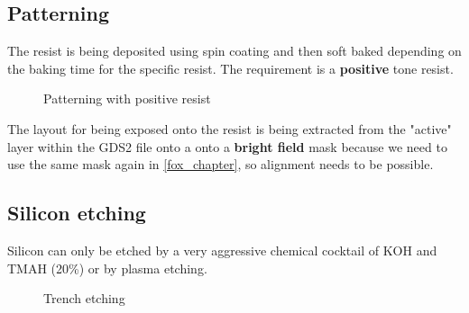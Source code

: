 \newpage

\subsection{Patterning}

The resist is being deposited using spin coating and then soft baked depending on the baking time for the specific resist.
The requirement is a \textbf{positive} tone resist.

\begin{figure}[H]
	\centering
	\begin{tikzpicture}[node distance = 3cm, auto, thick,scale=\CrossSectionOnly, every node/.style={transform shape}]
		
	\end{tikzpicture}
	\begin{tikzpicture}[node distance = 3cm, auto, thick,scale=\CrossSectionOnly, every node/.style={transform shape}]
		
	\end{tikzpicture}
	\caption{Patterning with positive resist}
\end{figure}

The layout for being exposed onto the resist is being extracted from the "active" layer within the GDS2 file onto a  onto a \textbf{bright field} mask because we need to use the same mask again in \autoref{fox_chapter}, so alignment needs to be possible.

\subsection{Silicon etching}\label{sti_trench_etch}

Silicon can only be etched by a very aggressive chemical cocktail of  KOH and TMAH (20\%) or by plasma etching.

\begin{figure}[H]
	\centering
	\begin{tikzpicture}[node distance = 3cm, auto, thick,scale=\CrossSectionOnly, every node/.style={transform shape}]
		
	\end{tikzpicture}
	\drawStepArrow{}
	\begin{tikzpicture}[node distance = 3cm, auto, thick,scale=\CrossSectionOnly, every node/.style={transform shape}]
		
	\end{tikzpicture}
	\caption{Trench etching}
\end{figure}

